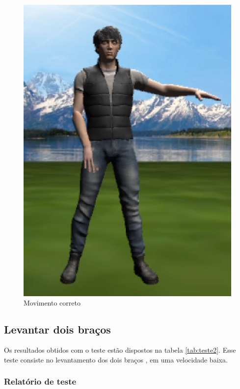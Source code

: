 \begin{figure}[H]
\centering
\includegraphics [keepaspectratio=true,scale=0.60]{figuras/imgteste1.eps}
\caption{Movimento correto}
\label{img2:teste1}
\end{figure}


\subsection{Levantar dois braços}\label{sub:teste2}
Os resultados obtidos com o teste estão dispostos na tabela \ref{tab:teste2}. Esse teste consiste no levantamento dos dois braços , em uma velocidade
baixa.

\subsubsection{Relatório de teste}\label{sub:relteste2}

